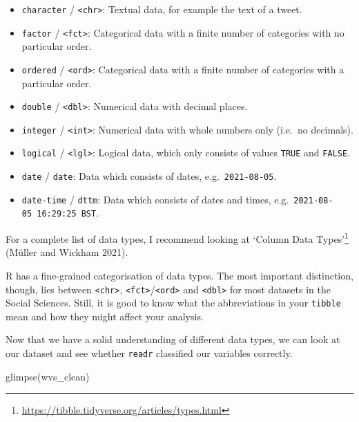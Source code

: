 \documentclass[
  letterpaper,
]{krantz}
\makeatletter
\newenvironment{Shaded}{\begin{snugshade}}{\end{snugshade}}
\newcommand{\FunctionTok}[1]{\textcolor[rgb]{0.28,0.35,0.67}{#1}}
\newcommand{\NormalTok}[1]{\textcolor[rgb]{0.00,0.23,0.31}{#1}}
\renewcommand{\href}[2]{#2\footnote{\url{#1}}}
\newenvironment{kframe}{%
\medskip{}
\setlength{\fboxsep}{.8em}
 \def\at@end@of@kframe{}%
 \ifinner\ifhmode%
  \def\at@end@of@kframe{\end{minipage}}%
  \begin{minipage}{\columnwidth}%
 \fi\fi%
 \def\FrameCommand##1{\hskip\@totalleftmargin \hskip-\fboxsep
 \colorbox{shadecolor}{##1}\hskip-\fboxsep
     \hskip-\linewidth \hskip-\@totalleftmargin \hskip\columnwidth}%
 \MakeFramed {\advance\hsize-\width
   \@totalleftmargin\z@ \linewidth\hsize
   \@setminipage}}%
 {\par\unskip\endMakeFramed%
 \at@end@of@kframe}
\renewenvironment{Shaded}{\begin{kframe}}{\end{kframe}}
\makeatother
\begin{document}
\begin{itemize}
\item
  \texttt{character} / \texttt{\textless{}chr\textgreater{}}: Textual
  data, for example the text of a tweet.
\item
  \texttt{factor} / \texttt{\textless{}fct\textgreater{}}: Categorical
  data with a finite number of categories with no particular order.
\item
  \texttt{ordered} / \texttt{\textless{}ord\textgreater{}}: Categorical
  data with a finite number of categories with a particular order.
\item
  \texttt{double} / \texttt{\textless{}dbl\textgreater{}}: Numerical
  data with decimal places.
\item
  \texttt{integer} / \texttt{\textless{}int\textgreater{}}: Numerical
  data with whole numbers only (i.e.~no decimals).
\item
  \texttt{logical} / \texttt{\textless{}lgl\textgreater{}}: Logical
  data, which only consists of values \texttt{TRUE} and \texttt{FALSE}.
\item
  \texttt{date} / \texttt{date}: Data which consists of dates,
  e.g.~\texttt{2021-08-05}.
\item
  \texttt{date-time} / \texttt{dttm}: Data which consists of dates and
  times, e.g.~\texttt{2021-08-05\ 16:29:25\ BST}.
\end{itemize}

For a complete list of data types, I recommend looking at
\href{https://tibble.tidyverse.org/articles/types.html}{`Column Data
Types'} (Müller and Wickham 2021).

R has a fine-grained categorisation of data types. The most important
distinction, though, lies between \texttt{\textless{}chr\textgreater{}},
\texttt{\textless{}fct\textgreater{}}/\texttt{\textless{}ord\textgreater{}}
and \texttt{\textless{}dbl\textgreater{}} for most datasets in the
Social Sciences. Still, it is good to know what the abbreviations in
your \texttt{tibble} mean and how they might affect your analysis.

Now that we have a solid understanding of different data types, we can
look at our dataset and see whether \texttt{readr} classified our
variables correctly.

\begin{Shaded}
\begin{Highlighting}[]
\FunctionTok{glimpse}\NormalTok{(wvs\_clean)}
\end{Highlighting}
\end{Shaded}
\end{document}

